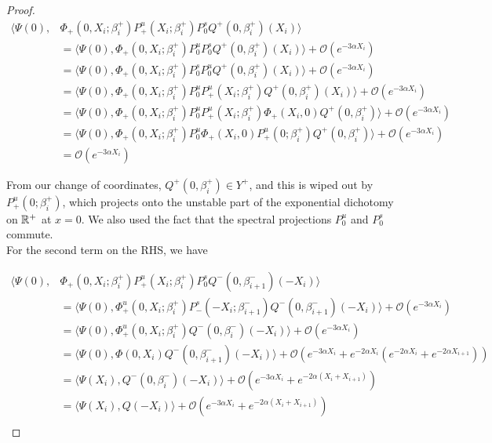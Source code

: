 \documentclass[thesis.tex]{subfiles}
\begin{document}
\begin{lemma}
\begin{proof}
\begin{align*}
\langle \Psi(0), &\Phi_+(0, X_i; \beta_i^+) P^u_+(X_i; \beta_i^+) P^s_0 Q^+(0, \beta_i^+)(X_i) \rangle \\
&= \langle \Psi(0), \Phi_+(0, X_i; \beta_i^+) P^u_0 P^s_0 Q^+(0, \beta_i^+)(X_i) \rangle + \mathcal{O}(e^{-3 \alpha X_i}) \\
&= \langle \Psi(0), \Phi_+(0, X_i; \beta_i^+) P^s_0 P^u_0 Q^+(0, \beta_i^+)(X_i) \rangle + \mathcal{O}(e^{-3 \alpha X_i}) \\
&= \langle \Psi(0), \Phi_+(0, X_i; \beta_i^+) P^u_0 P^u_+(X_i; \beta_i^+) Q^+(0, \beta_i^+)(X_i) \rangle + \mathcal{O}(e^{-3 \alpha X_i}) \\
&= \langle \Psi(0), \Phi_+(0, X_i; \beta_i^+) P^u_0 P^u_+(X_i; \beta_i^+) \Phi_+(X_i, 0) Q^+(0, \beta_i^+)\rangle + \mathcal{O}(e^{-3 \alpha X_i}) \\
&= \langle \Psi(0), \Phi_+(0, X_i; \beta_i^+) P^u_0 \Phi_+(X_i, 0) P^u_+(0; \beta_i^+) Q^+(0, \beta_i^+)\rangle + \mathcal{O}(e^{-3 \alpha X_i}) \\
&= \mathcal{O}(e^{-3 \alpha X_i})
\end{align*}

From our change of coordinates, $Q^+(0, \beta_i^+) \in Y^+$, and this is wiped out by $P^u_+(0; \beta_i^+)$, which projects onto the unstable part of the exponential dichotomy on ${\mathbb R}^+$ at $x = 0$. We also used the fact that the spectral projections $P^u_0$ and $P^s_0$ commute. \\

For the second term on the RHS, we have

\begin{align*}
\langle \Psi(0), &\Phi_+(0, X_i; \beta_i^+) P^u_+(X_i; \beta_i^+) P^s_0 Q^-(0, \beta_{i+1}^-)(-X_i) \rangle \\
&= \langle \Psi(0), \Phi_+^u(0, X_i; \beta_i^+) P^s_-(-X_i; \beta_{i+1}^-) Q^-(0, \beta_{i+1}^-)(-X_i) \rangle + \mathcal{O}(e^{-3 \alpha X_i}) \\
&= \langle \Psi(0), \Phi_+^u(0, X_i; \beta_i^+) Q^-(0, \beta_i^-)(-X_i) \rangle + \mathcal{O}(e^{-3 \alpha X_i}) \\
&= \langle \Psi(0), \Phi(0, X_i) Q^-(0, \beta_{i+1}^-)(-X_i) \rangle + \mathcal{O}(e^{-3 \alpha X_i} + e^{-2 \alpha X_i} (e^{-2 \alpha X_i} + e^{-2 \alpha X_{i+1}})) \\
&= \langle \Psi(X_i), Q^-(0, \beta_i^-)(-X_i) \rangle + \mathcal{O}(e^{-3 \alpha X_i} + e^{-2 \alpha (X_i + X_{i+1})}) \\
&= \langle \Psi(X_i), Q(-X_i) \rangle + \mathcal{O}(e^{-3 \alpha X_i} + e^{-2 \alpha (X_i + X_{i+1})}) \\
\end{align*}


\end{proof}
\end{lemma}
\end{document}

